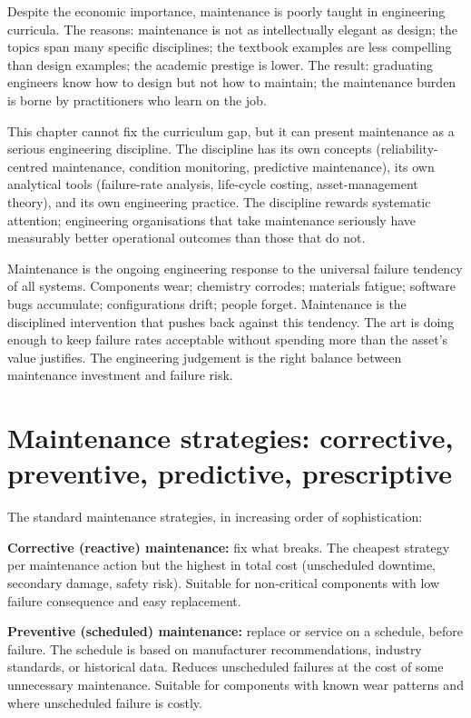 Despite the economic importance, maintenance is poorly taught in engineering curricula. The reasons: maintenance is not as intellectually elegant as design; the topics span many specific disciplines; the textbook examples are less compelling than design examples; the academic prestige is lower. The result: graduating engineers know how to design but not how to maintain; the maintenance burden is borne by practitioners who learn on the job.

This chapter cannot fix the curriculum gap, but it can present maintenance as a serious engineering discipline. The discipline has its own concepts (reliability-centred maintenance, condition monitoring, predictive maintenance), its own analytical tools (failure-rate analysis, life-cycle costing, asset-management theory), and its own engineering practice. The discipline rewards systematic attention; engineering organisations that take maintenance seriously have measurably better operational outcomes than those that do not.

\begin{archetype}
Maintenance is the ongoing engineering response to the universal failure tendency of all systems. Components wear; chemistry corrodes; materials fatigue; software bugs accumulate; configurations drift; people forget. Maintenance is the disciplined intervention that pushes back against this tendency. The art is doing enough to keep failure rates acceptable without spending more than the asset's value justifies. The engineering judgement is the right balance between maintenance investment and failure risk.
\end{archetype}

\section{Maintenance strategies: corrective, preventive, predictive, prescriptive}

The standard maintenance strategies, in increasing order of sophistication:

\textbf{Corrective (reactive) maintenance:} fix what breaks. The cheapest strategy per maintenance action but the highest in total cost (unscheduled downtime, secondary damage, safety risk). Suitable for non-critical components with low failure consequence and easy replacement.

\textbf{Preventive (scheduled) maintenance:} replace or service on a schedule, before failure. The schedule is based on manufacturer recommendations, industry standards, or historical data. Reduces unscheduled failures at the cost of some unnecessary maintenance. Suitable for components with known wear patterns and where unscheduled failure is costly.

